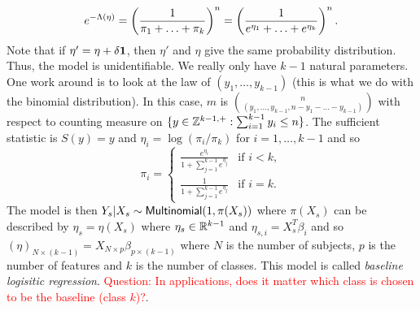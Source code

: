 \begin{examples}
\begin{itemize}
        \[e^{-\Lambda(\eta)} = \left(\frac{1}{\pi_1+\ldots+\pi_k}\right)^n = \left(\frac{1}{e^{\eta_1}+\ldots+e^{\eta_k}}\right)^n. \]
        Note that if $\eta' = \eta + \delta {{\bf 1}}$, then $\eta'$ and $\eta$ give the same probability distribution. Thus, the model is unidentifiable. We really only have $k-1$ natural parameters. One work around is to look at the law of $(y_1,\ldots, y_{k-1})$ (this is what we do with the binomial distribution). In this case, $m$ is $\binom{n}{(y_1,\ldots,y_{k-1},n-y_{1}-\ldots-y_{k-1})}$ with respect to counting measure on $\{y \in {{\mathbb Z}}^{k-1,+}: \sum_{i=1}^{k-1} y_i \le n \}$. The sufficient statistic is $S(y)=y$ and $\eta_i = \log(\pi_i/\pi_k)$ for $i=1,\ldots,k-1$ and so 
        \[\pi_i = \begin{cases}
            \frac{e^{\eta_i}}{1+\sum_{j=1}^{k-1}e^{\eta_j}}& \text{if } i < k,\\
            \frac{1}{1+\sum_{j=1}^{k-1}e^{\eta_j}} & \text{if } i=k.
        \end{cases} \]
        The model is then $Y_s |X_s \sim \mathsf{Multinomial}(1,\pi(X_s))$ where $\pi(X_s)$ can be described by $\eta_s = \eta(X_s)$ where $\eta_s \in {\mathbb R}^{k-1}$ and $\eta_{s,i}= X_s^T\beta_i$ and so $(\eta)_{N \times (k-1)} = X_{N \times p}\beta_{p \times (k-1)}$ where $N$ is the number of subjects, $p$ is the number of features and $k$ is the number of classes. This model is called \emph{baseline logisitic regression}. \textcolor{red}{Question: In applications, does it matter which class is chosen to be the baseline (class $k$)?}.
    \end{itemize}
\end{examples}
